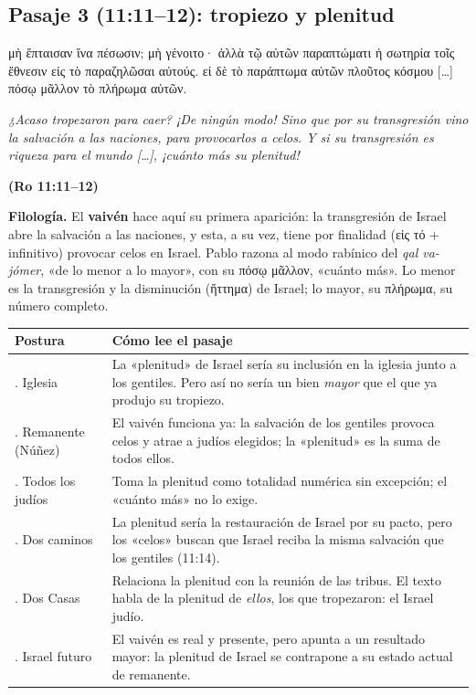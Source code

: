 \documentclass[11pt,letterpaper]{article}
\newcommand{\grc}[1]{\foreignlanguage{ancientgreek}{#1}}
\newcommand{\fuente}[1]{\par\hfill{\upshape\bfseries\small\textcolor{ladrillo}{#1}}}
\newcommand{\destacar}[1]{\textbf{\textcolor{ladrillo}{#1}}}
\begin{document}
\subsection{Pasaje 3 (11:11--12): tropiezo y plenitud}

\begin{cita}[fontupper=\upshape]
\grc{μὴ ἔπταισαν ἵνα πέσωσιν; μὴ γένοιτο· ἀλλὰ τῷ αὐτῶν παραπτώματι ἡ σωτηρία τοῖς ἔθνεσιν εἰς τὸ παραζηλῶσαι αὐτούς. εἰ δὲ τὸ παράπτωμα αὐτῶν πλοῦτος κόσμου [\ldots] πόσῳ μᾶλλον τὸ πλήρωμα αὐτῶν.}\par\smallskip
\itshape ¿Acaso tropezaron para caer? ¡De ningún modo! Sino que por su transgresión vino la salvación a las naciones, para provocarlos a celos. Y si su transgresión es riqueza para el mundo [\ldots], ¡cuánto más su plenitud!\fuente{(Ro 11:11--12)}
\end{cita}

\textbf{Filología.} El \destacar{vaivén} hace aquí su primera aparición: la transgresión de Israel abre la salvación a las naciones, y esta, a su vez, tiene por finalidad (\grc{εἰς τό} + infinitivo) provocar celos en Israel. Pablo razona al modo rabínico del \emph{qal va-jómer}, «de lo menor a lo mayor», con su \grc{πόσῳ μᾶλλον}, «cuánto más». Lo menor es la transgresión y la disminución (\grc{ἥττημα}) de Israel; lo mayor, su \grc{πλήρωμα}, su número completo.

\begin{center}\footnotesize
\renewcommand{\arraystretch}{1.25}
\begin{tabular}{>{\RaggedRight\arraybackslash}p{2.9cm}>{\RaggedRight\arraybackslash}p{11.1cm}}
\toprule
\textbf{Postura} & \textbf{Cómo lee el pasaje}\\
\midrule
1. Iglesia & La «plenitud» de Israel sería su inclusión en la iglesia junto a los gentiles. Pero así no sería un bien \emph{mayor} que el que ya produjo su tropiezo.\\
2. Remanente (Núñez) & El vaivén funciona ya: la salvación de los gentiles provoca celos y atrae a judíos elegidos; la «plenitud» es la suma de todos ellos.\\
3. Todos los judíos & Toma la plenitud como totalidad numérica sin excepción; el «cuánto más» no lo exige.\\
4. Dos caminos & La plenitud sería la restauración de Israel por su pacto, pero los «celos» buscan que Israel reciba la misma salvación que los gentiles (11:14).\\
5. Dos Casas & Relaciona la plenitud con la reunión de las tribus. El texto habla de la plenitud de \emph{ellos}, los que tropezaron: el Israel judío.\\
6. Israel futuro & El vaivén es real y presente, pero apunta a un resultado mayor: la plenitud de Israel se contrapone a su estado actual de remanente.\\
\bottomrule
\end{tabular}\end{center}
\end{document}
